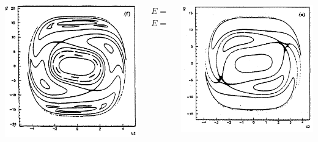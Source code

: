 \documentclass[a4,compress]{beamer}
\begin{document}
\begin{frame}
\begin{columns}[c]
\begin{column}{0.35\textwidth}
    \includegraphics[height=0.45\textheight]{ponicare-sections-e_600}
  \end{column}
  \begin{column}{0.15\textwidth}
    \small \centering \(E = 240\) \\
    \vspace{3cm}
    \(E = 600\)
  \end{column}
  \begin{column}{0.35\textwidth}
    \includegraphics[height=0.45\textheight]{ponicare-sections-e_400}


\end{column}
\end{columns}
\end{frame}
\end{document}
